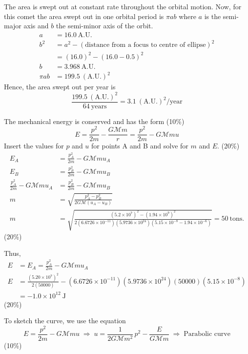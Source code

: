 The area is swept out at constant rate throughout the orbital motion.
Now, for this comet the area swept out in one orbital period is $\pi ab$ where
$a$ is the semi-major axis and $b$ the semi-minor axis of the orbit.
\begin{align*}
  a &= 16.0\ \text{A.U.} \\
  b^2 &= a^2 - (\text{distance from a focus to centre of ellipse})^2 \\
  &= (16.0)^2 - (16.0 - 0.5)^2 \\
  b &= 3.968\ \text{A.U.} \\
  \pi ab &= 199.5\ (\text{A.U.})^2
\end{align*}
Hence, the area swept out per year is
\[
  \frac{199.5\ (\text{A.U.})^2}{64\ \text{years}}
  = 3.1\ (\text{A.U.})^2/\text{year}
\]

The mechanical energy is conserved and has the form \hfill(10\%)
\[
  E = \frac{p^2}{2m} - \frac{G\mathcal{M}m}{r} = \frac{p^2}{2m} - G\mathcal{M}mu
\]
Insert the values for $p$ and $u$ for points A and B and solve for $m$ and $E$.
\hfill(20\%)
\begin{align*}
  E_A &= \frac{p_A^2}{2m} - G\mathcal{M}mu_A \\
  E_B &= \frac{p_B^2}{2m} - G\mathcal{M}mu_B \\
  \frac{p_A^2}{2m} - G\mathcal{M}mu_A &= \frac{p_B^2}{2m} - G\mathcal{M}mu_B \\
  m &= \sqrt{\frac{p_A^2 - p_B^2}{2G\mathcal{M}(u_A - u_B)}} \\
  m &= \sqrt{\frac{(5.2\times 10^{7})^2 - (1.94\times 10^{9})^2}
       {2(6.6726\times 10^{-11})(5.9736\times 10^{24})
        (5.15\times 10^{-8} - 1.94\times 10^{-6})}}
     = 50\ \text{tons.}
\end{align*}
\hfill(20\%)

Thus,
\begin{align*}
  E &= E_A = \frac{p_A^2}{2m} - G\mathcal{M}mu_A \\
  E &= \frac{(5.20\times 10^{7})^2}{2(50000)}
      - (6.6726\times 10^{-11})(5.9736\times 10^{24})(50000)
        (5.15\times 10^{-8}) \\
  &= -1.0\times 10^{12}\ \text{J}
\end{align*}
\hfill(20\%)

To sketch the curve, we use the equation
\[
  E = \frac{p^2}{2m} - G\mathcal{M}mu
  \;\Longrightarrow\;
  u = \frac{1}{2G\mathcal{M}m^2}\,p^2 - \frac{E}{G\mathcal{M}m}
  \;\Longrightarrow\;
  \text{Parabolic curve}
\]
\hfill(10\%)

